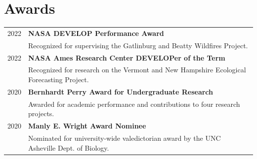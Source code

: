 \section{Awards}

\setlength{\arrayrulewidth}{.01pt}
\setlength{\tabcolsep}{8pt}
\setlength{\LTpre}{0pt}

\begin{longtable}{r|p{15.6cm}}

    \small{2022} & \textbf{NASA DEVELOP Performance Award} \\
    & Recognized for supervising the Gatlinburg and Beatty Wildfires Project.\\
    \small{2022} & \textbf{NASA Ames Research Center DEVELOPer of the Term} \\
    & Recognized for research on the Vermont and New Hampshire Ecological Forecasting Project.\\
    \small{2020} & \textbf{Bernhardt Perry Award for Undergraduate Research} \\
    & Awarded for academic performance and contributions to four research projects.\\
    \small{2020} & \textbf{Manly E. Wright Award Nominee} \\
    & Nominated for university-wide valedictorian award by the UNC Asheville Dept. of Biology.\\

\end{longtable}